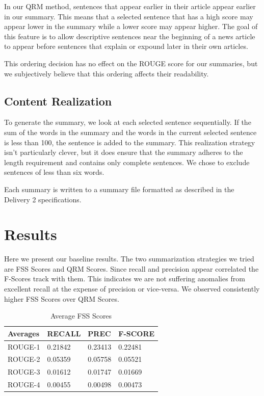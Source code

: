 \documentclass[11pt,a4paper]{article}
\begin{document}
In our QRM method, sentences that appear earlier in their article appear earlier in our summary. This means that a selected sentence that has a high score may appear lower in the summary while a lower score may appear higher. The goal of this feature is to allow descriptive sentences near the beginning of a news article to appear before sentences that explain or expound later in their own articles. 

This ordering decision has no effect on the ROUGE score for our summaries, but we subjectively believe that this ordering affects their readability.

\subsection{Content Realization}
To generate the summary, we look at each selected sentence sequentially. If the sum of the words in the summary and the words in the current selected sentence is less than 100, the sentence is added to the summary. This realization strategy isn’t particularly clever, but it does ensure that the summary adheres to the length requirement and contains only complete sentences. We chose to exclude sentences of less than six words.

Each summary is written to a summary file formatted as described in the Delivery 2 specifications.

\section{Results}
Here we present our baseline results. The two summarization strategies we tried are FSS Scores and QRM Scores. Since recall and precision appear correlated the F-Scores track with them. This indicates we are not suffering anomalies from excellent recall at the expense of precision or vice-versa. We observed consistently higher FSS Scores over QRM Scores.\\

\begin{table}[h]
\centering
\caption{Average FSS Scores}
\label{table1}
\begin{tabular}{|l|l|l|l|}
\hline
Averages   & RECALL  & PREC    & F-SCORE \\ \hline
ROUGE-1    & 0.21842 & 0.23413 & 0.22481 \\ \hline
ROUGE-2    & 0.05359 & 0.05758 & 0.05521 \\ \hline
ROUGE-3    & 0.01612 & 0.01747 & 0.01669 \\ \hline
ROUGE-4    & 0.00455 & 0.00498 & 0.00473 \\ \hline
\end{tabular}
\end{table}
\end{document}
